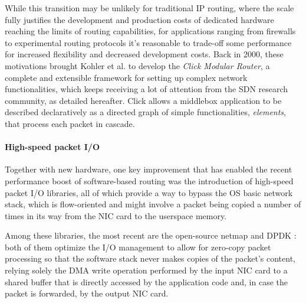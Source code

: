 \documentclass[12pt,a4paper,twoside]{book}
\begin{document}

While this transition may be unlikely for traditional IP routing, where the scale fully justifies the development and production costs of dedicated hardware reaching the limits of routing capabilities, for applications ranging from firewalls to experimental routing protocols it's reasonable to trade-off some performance for increased flexibility and decreased development costs.
Back in 2000, these motivations brought Kohler et al. \cite{click} to develop the \textit{Click Modular Router}, a complete and extensible framework for setting up complex network functionalities, which keeps receiving a lot of attention from the \gls{SDN} research community, as detailed hereafter. Click allows a middlebox application to be described declaratively as a directed graph of simple functionalities, \emph{elements}, that process each packet in cascade. %

\paragraph{High-speed packet I/O} Together with new hardware, one key improvement that has enabled the recent performance boost of software-based routing was the introduction of high-speed packet I/O libraries, all of which provide a way to bypass the OS basic network stack, which is flow-oriented and might involve a packet being copied a number of times in its way from the NIC card to the userspace memory. %

Among these libraries, the most recent are the open-source netmap\cite{netmap} and DPDK\cite{dpdk}%
: both of them optimize the I/O management to allow for zero-copy packet processing so that the software stack never makes copies of the packet's content, relying solely the DMA write operation performed by the input NIC card to a shared buffer that is directly accessed by the application code and, in case the packet is forwarded, by the output NIC card.
\end{document}
